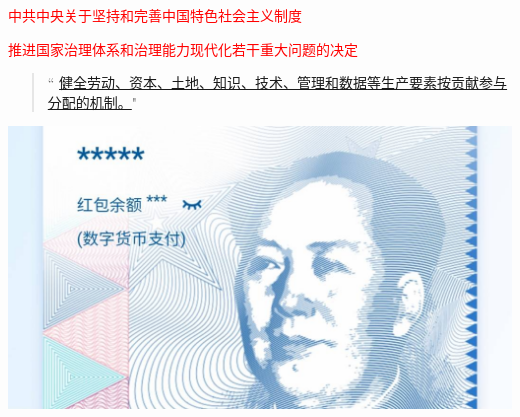 \documentclass[aspectratio=169, 14pt]{beamer}
\begin{document}
\begin{frame}
	\begin{center}
		\textcolor{red}{\large 中共中央关于坚持和完善中国特色社会主义制度}

		\textcolor{red}{推进国家治理体系和治理能力现代化若干重大问题的决定}
	\end{center}
	\begin{quote}
		`` \href{https://www.cac.gov.cn/2024-01/05/c_1706119078060945.htm}{健全劳动、资本、土地、知识、技术、管理和\alert{数据}等生产要素按贡献参与分配的机制。}"
	\end{quote}
	\begin{center}
		\includegraphics[width=.5\textwidth]{image/rmb}
	\end{center}

\end{frame}
\end{document}

